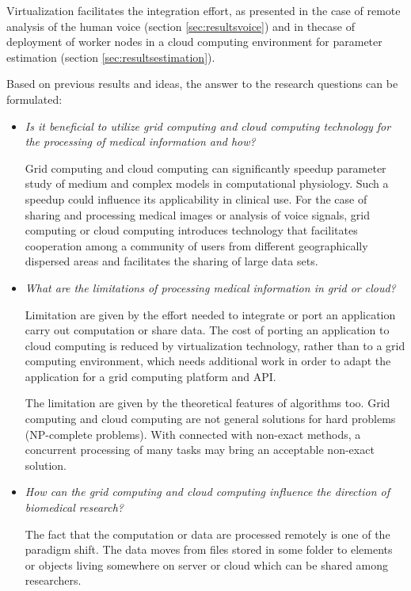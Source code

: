 Virtualization facilitates the integration effort, as presented in the case of remote analysis of the human voice (section \ref{sec:resultsvoice}) and in thecase of deployment of worker nodes in a cloud computing environment for parameter estimation (section \ref{sec:resultsestimation}). 

Based on previous results and ideas, the answer to the research questions can be formulated:
\begin{itemize} 
\item \emph{Is it beneficial to utilize grid computing and cloud computing technology for the processing of medical information and how?}

Grid computing and cloud computing can significantly speedup parameter study of medium and complex models in computational physiology. Such a speedup could influence its applicability in clinical use. %
For the case of sharing and processing medical images or analysis of voice signals, grid computing or cloud computing introduces technology that facilitates cooperation among a community of users from different geographically dispersed areas and facilitates the sharing of large data sets.

\item \emph{What are the limitations of processing medical information in grid or cloud?}

Limitation are given by the effort needed to integrate or port an application carry out computation or share data. The cost of porting an application to cloud computing is reduced by virtualization technology, rather than to a grid computing environment, which needs additional work in order to adapt the application for a grid computing platform and API. 

The limitation are given by the theoretical features of algorithms too. Grid computing and cloud computing are not general solutions for hard problems (NP-complete problems). With connected with non-exact methods, a concurrent processing of many tasks may bring an acceptable non-exact solution.

\item \emph{How can the grid computing and cloud computing influence the direction of biomedical research?}

The fact that the computation or data are processed remotely is one of the paradigm shift. The data moves from files stored in some folder to elements or objects living somewhere on server or cloud which can be shared among researchers. 
 

\end{itemize}
